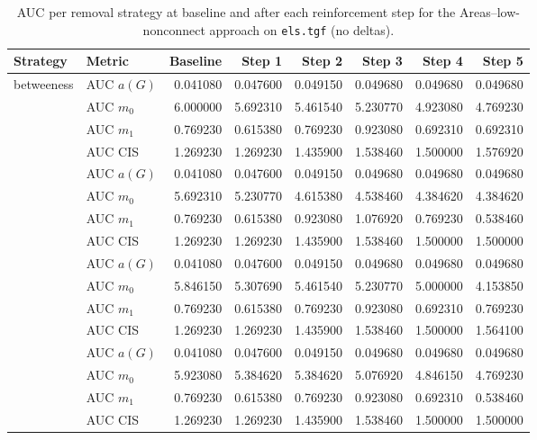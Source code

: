 \begin{table}[htbp]
  \centering
  \caption{AUC per removal strategy at baseline and after each reinforcement step for the Areas–low-nonconnect approach on \texttt{els.tgf} (no deltas).}
  \label{tab:els-areas_low_nonconnect-auc}
  \begin{tabular}{llrrrrrr}
    \toprule
    \textbf{Strategy} & \textbf{Metric} & \textbf{Baseline} & \textbf{Step 1} & \textbf{Step 2} & \textbf{Step 3} & \textbf{Step 4} & \textbf{Step 5} \\
    \midrule
    \multirow{4}{*}{betweeness} & AUC $a(G)$ & 0.041080 & 0.047600 & 0.049150 & 0.049680 & 0.049680 & 0.049680 \\
    & AUC $m_0$ & 6.000000 & 5.692310 & 5.461540 & 5.230770 & 4.923080 & 4.769230 \\
    & AUC $m_1$ & 0.769230 & 0.615380 & 0.769230 & 0.923080 & 0.692310 & 0.692310 \\
    & AUC CIS & 1.269230 & 1.269230 & 1.435900 & 1.538460 & 1.500000 & 1.576920 \\
    \addlinespace
    \multirow{4}{*}{closeness} & AUC $a(G)$ & 0.041080 & 0.047600 & 0.049150 & 0.049680 & 0.049680 & 0.049680 \\
    & AUC $m_0$ & 5.692310 & 5.230770 & 4.615380 & 4.538460 & 4.384620 & 4.384620 \\
    & AUC $m_1$ & 0.769230 & 0.615380 & 0.923080 & 1.076920 & 0.769230 & 0.538460 \\
    & AUC CIS & 1.269230 & 1.269230 & 1.435900 & 1.538460 & 1.500000 & 1.500000 \\
    \addlinespace
    \multirow{4}{*}{core influence} & AUC $a(G)$ & 0.041080 & 0.047600 & 0.049150 & 0.049680 & 0.049680 & 0.049680 \\
    & AUC $m_0$ & 5.846150 & 5.307690 & 5.461540 & 5.230770 & 5.000000 & 4.153850 \\
    & AUC $m_1$ & 0.769230 & 0.615380 & 0.769230 & 0.923080 & 0.692310 & 0.769230 \\
    & AUC CIS & 1.269230 & 1.269230 & 1.435900 & 1.538460 & 1.500000 & 1.564100 \\
    \addlinespace
    \multirow{4}{*}{degree} & AUC $a(G)$ & 0.041080 & 0.047600 & 0.049150 & 0.049680 & 0.049680 & 0.049680 \\
    & AUC $m_0$ & 5.923080 & 5.384620 & 5.384620 & 5.076920 & 4.846150 & 4.769230 \\
    & AUC $m_1$ & 0.769230 & 0.615380 & 0.769230 & 0.923080 & 0.692310 & 0.538460 \\
    & AUC CIS & 1.269230 & 1.269230 & 1.435900 & 1.538460 & 1.500000 & 1.500000 \\

\end{tabular}
\end{table}
